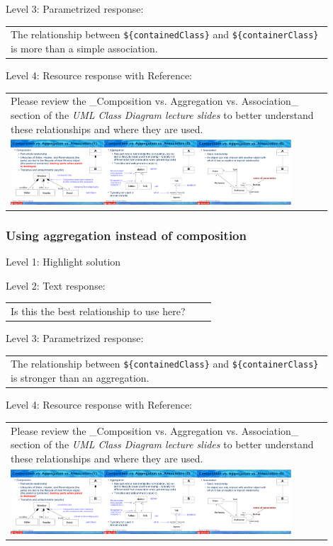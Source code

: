 \noindent Level 3: Parametrized response: \medskip

\begin{tabular}{|p{0.9\linewidth}}
The relationship between \verb|${containedClass}| and \verb|${containerClass}| is more than a simple association.
\end{tabular} \medskip

\noindent Level 4: Resource response with Reference: \medskip

\begin{tabular}{|p{0.9\linewidth}}
Please review the _Composition vs. Aggregation vs. Association_ section of 
the \textit{UML Class Diagram lecture slides} to 
better understand these relationships and where they are used.

\\
\includegraphics[width=0.9\textwidth]{images/composition_aggregation_association.png}
\end{tabular} \medskip


\subsubsection{Using aggregation instead of composition}

\noindent Level 1: Highlight solution \medskip

\noindent Level 2: Text response: \medskip

\begin{tabular}{|p{0.9\linewidth}}
Is this the best relationship to use here?
\end{tabular} \medskip

\noindent Level 3: Parametrized response: \medskip

\begin{tabular}{|p{0.9\linewidth}}
The relationship between \verb|${containedClass}| and \verb|${containerClass}| is stronger than an aggregation.
\end{tabular} \medskip

\noindent Level 4: Resource response with Reference: \medskip

\begin{tabular}{|p{0.9\linewidth}}
Please review the _Composition vs. Aggregation vs. Association_ section of 
the \textit{UML Class Diagram lecture slides} to 
better understand these relationships and where they are used.

\\
\includegraphics[width=0.9\textwidth]{images/composition_aggregation_association.png}
\end{tabular} \medskip


